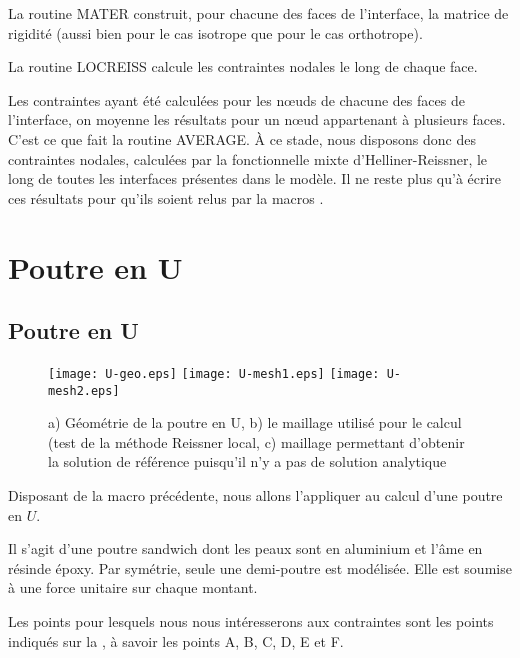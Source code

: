 \medskip
La routine MATER construit, pour chacune des faces de l'interface, la matrice de rigidité (aussi bien pour le cas isotrope
que pour le cas orthotrope).

\medskip
La routine LOCREISS calcule les contraintes nodales le long de chaque face.

\medskip
Les contraintes ayant été calculées pour les nœuds de chacune des faces de l'interface, on moyenne les résultats
pour un nœud appartenant à plusieurs faces. C'est ce que fait la routine AVERAGE. À ce stade, nous disposons donc
des contraintes nodales, calculées par la fonctionnelle mixte d'Helliner-Reissner, le long de toutes les interfaces présentes
dans le modèle. Il ne reste plus qu'à écrire ces résultats pour qu'ils soient relus par la macros \ansys.










\medskip
\ifVersionAvecExemplesSepares
   \section{Poutre en U}
\else
   \subsection{Poutre en U}
\fi

\begin{figure}[ht]
   \texttt{[image: U-geo.eps]} \hfill 
   \texttt{[image: U-mesh1.eps]}\hfill 
   \texttt{[image: U-mesh2.eps]}
   \caption{\label{Fig-poutU-geo} a) Géométrie de la poutre en U, b) le maillage utilisé pour le calcul (test de la méthode Reissner local,
c) maillage permettant d'obtenir la \og solution de référence\fg{} puisqu'il n'y a pas de solution analytique}
\end{figure}

Disposant de la macro précédente, nous allons l'appliquer au calcul d'une poutre en $U$.

Il s'agit d'une poutre sandwich dont les peaux sont en aluminium et l'âme en résinde époxy.
Par symétrie, seule une demi-poutre est modélisée. Elle est soumise à une force unitaire
sur chaque montant.

\medskip
Les points pour lesquels nous nous intéresserons aux contraintes sont les points indiqués sur la
, à savoir les points A, B, C, D, E et F.



